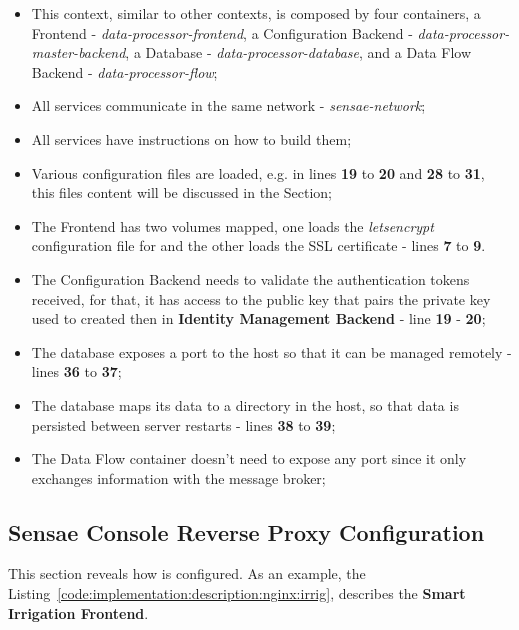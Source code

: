 \begin{itemize}
    \item This context, similar to other contexts, is composed by four containers, a Frontend - \textit{data-processor-frontend}, a Configuration Backend - \textit{data-processor-master-backend}, a Database - \textit{data-processor-database}, and a Data Flow Backend - \textit{data-processor-flow};
    \item All services communicate in the same network - \textit{sensae-network};
    \item All services have instructions on how to build them;
    \item Various configuration files are loaded, e.g. in lines \textbf{19} to \textbf{20} and \textbf{28} to \textbf{31}, this files content will be discussed in the  Section;
    \item The Frontend has two volumes mapped, one loads the \textit{letsencrypt} configuration file for  and the other loads the SSL certificate - lines \textbf{7} to \textbf{9}.
    \item The Configuration Backend needs to validate the authentication tokens received, for that, it has access to the public key that pairs the private key used to created then in \textbf{Identity Management Backend} - line \textbf{19} - \textbf{20};
    \item The database exposes a port to the host so that it can be managed remotely - lines \textbf{36} to \textbf{37};
    \item The database maps its data to a directory in the host, so that data is persisted between server restarts - lines \textbf{38} to \textbf{39};
    \item The Data Flow container doesn't need to expose any port since it only exchanges information with the message broker;
\end{itemize}

\subsection{Sensae Console Reverse Proxy Configuration}
\label{subsec:implementation:description:nginx}

This section reveals how  is configured. As an example, the Listing~\ref{code:implementation:description:nginx:irrig}, describes the \textbf{Smart Irrigation Frontend}.

